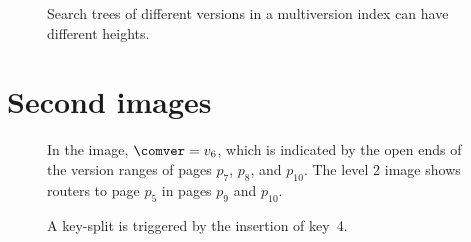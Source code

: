 \begin{figure}[htb]
\begin{center}
  
  {Search trees of different versions in a multiversion index can
  have different heights.}
  \label{fig:mv-height-decrease}
\end{center}
\end{figure}

\begin{figure}[htb]
\begin{center}

\label{fig:mv-index-example}
\end{center}
\end{figure}

\chapter{Second images}

\begin{figure}[htb]
\begin{center}
\subfigure[Level 1]{
\label{fig:mvbt-space-partition:level-1}}
\subfigure[Level 2]{
\label{fig:mvbt-space-partition:level-2}}
%
{In the image, $\comver = v_6$, which is indicated by the open ends of the
version ranges of pages $p_7$, $p_8$, and $p_{10}$.
The level \num{2} image shows routers to page $p_5$ in pages $p_9$ and
$p_{10}$.}
\label{fig:mvbt-space-partition}
\end{center}
\end{figure}

\begin{figure}[htb]
\begin{center}
  
  \label{fig:mvbt-invalid-split}
\end{center}
\end{figure}

\begin{figure}[htb]
\begin{center}
  
  {A key-split is triggered by the insertion of key~\num{4}.}
  \label{fig:mvbt-invalid-split-solved}
\end{center}
\end{figure}

